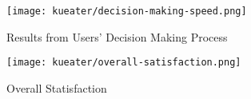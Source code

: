 \begin{figure}[h!]
    \centering
    \texttt{[image: kueater/decision-making-speed.png]}
    \caption{Results from Users' Decision Making Process}
    \label{fig:decision-making-speed}
\end{figure}

\begin{figure}[h!]
    \centering
    \texttt{[image: kueater/overall-satisfaction.png]}
    \caption{Overall Statisfaction}
    \label{fig:overall-satisfaction}
\end{figure}